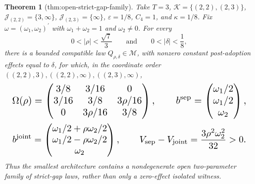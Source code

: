 \documentclass{article}
\newtheorem{theorem}{Theorem}
\begin{document}
\begin{theorem}[thm:open-strict-gap-family]\label{thm:open-strict-gap-family}
Take \(T=3\), \(\mathcal K=\{(2,2),(2,3)\}\), \(\mathcal J_{(2,2)}=\{3,\infty\}\), \(\mathcal J_{(2,3)}=\{\infty\}\), \(\varepsilon=1/8\), \(C_4=1\), and \(\kappa=1/8\). Fix \(\omega=(\omega_1,\omega_2)^{\prime}\) with \(\omega_1+\omega_2=1\) and \(\omega_2\ne0\). For every
\[
0<|\rho|<\frac{\sqrt7}{3}
\qquad\text{and}\qquad
0<|\delta|<\frac18,
\]
there is a bounded compatible law \(Q_{\rho,\delta}\in\mathcal M\), with nonzero constant post-adoption effects equal to \(\delta\), for which, in the coordinate order \(((2,2),3),((2,2),\infty),((2,3),\infty)\),
\[
\makebox[\linewidth][c]{\resizebox{0.98\linewidth}{!}{\(\displaystyle \Omega(\rho)=
\begin{pmatrix}
3/8&3/16&0\\
3/16&3/8&3\rho/16\\
0&3\rho/16&3/8
\end{pmatrix},
\qquad
b^{\mathrm{sep}}=
\begin{pmatrix}\omega_1/2\\ \omega_1/2\\ \omega_2\end{pmatrix},\)}}
\]
\[
\makebox[\linewidth][c]{\resizebox{0.98\linewidth}{!}{\(\displaystyle b^{\mathrm{joint}}=
\begin{pmatrix}
\omega_1/2+\rho\omega_2/2\\
\omega_1/2-\rho\omega_2/2\\
\omega_2
\end{pmatrix},
\qquad
V_{\mathrm{sep}}-V_{\mathrm{joint}}
=\frac{3\rho^2\omega_2^2}{32}>0.\)}}
\]
Thus the smallest architecture contains a nondegenerate open two-parameter family of strict-gap laws, rather than only a zero-effect isolated witness.
\end{theorem}
\end{document}

